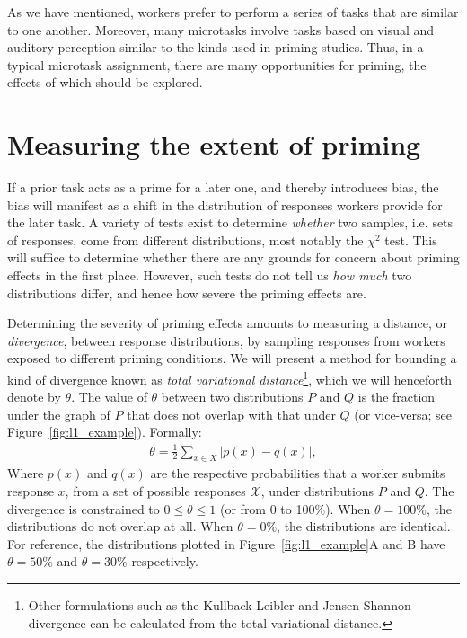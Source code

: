 \documentclass{sigchi}
\begin{document}
As we have mentioned, workers prefer to perform a series of tasks that
are similar to one another.
Moreover, many 
microtasks involve tasks based on visual and auditory perception 
similar to the kinds used in priming studies.
Thus, in a typical microtask assignment, there are many opportunities for 
priming, the effects of which should be explored.

\section{Measuring the extent of priming}
If a prior task acts as a prime for a later one, 
and thereby introduces bias, the bias will manifest as
a shift in the distribution of responses 
workers provide for the later task.
A variety of tests exist to determine \textit{whether} two samples, 
i.e. sets of responses, come from different distributions, 
most notably the $\chi^2$ test.  
This will suffice to determine whether there are any grounds for concern 
about priming effects in the first place.  However, such tests
do not tell us \textit{how much} two distributions differ, and hence
how severe the priming effects are.

Determining the severity of priming effects amounts to measuring a 
distance, or \textit{divergence}, between response distributions, by
sampling responses from workers exposed to different priming conditions.
We will present a method for bounding a kind of divergence known as 
\textit{total variational distance}\footnote{
  Other formulations such as the Kullback-Leibler and 
  Jensen-Shannon divergence can be calculated from the total variational
  distance.
}, which we will henceforth denote by $\theta$.
The value of $\theta$ between two distributions $P$ and $Q$ 
is the fraction under the graph of $P$ that does not overlap with that
under $Q$ (or vice-versa; see Figure~\ref{fig:l1_example}).  
Formally:
\begin{align}
	\theta = \frac{1}{2}\sum_{x \in X} \left| p(x) - q(x) \right|,
	\label{eq:theta}
\end{align}
Where $p(x)$ and $q(x)$ are the respective probabilities 
that a worker submits response $x$, from a set of possible responses 
$\mathcal{X}$, under distributions $P$ and $Q$.
The divergence is constrained to 
$0 \leq \theta \leq 1$ (or from 0 to 100\%).
When $\theta = 100\%$, the distributions do not overlap at all.  
When $\theta = 0\%$, the distributions are identical.
For reference, the distributions plotted in 
Figure~\ref{fig:l1_example}A and B have $\theta=50\%$ and $\theta=30\%$ 
respectively.
\end{document}
